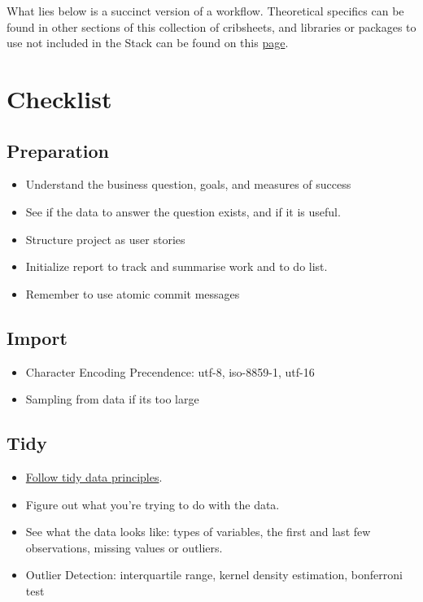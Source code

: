 \documentclass[]{book}
\theoremstyle{definition}
\theoremstyle{definition}
\theoremstyle{definition}
\theoremstyle{remark}
\begin{document}
What lies below is a succinct version of a workflow. Theoretical
specifics can be found in other sections of this collection of
cribsheets, and libraries or packages to use not included in the Stack
can be found on this
\href{https://gfleetwood.github.io/noted-resources/data_science.html}{page}.

\section{Checklist}\label{checklist}

\subsection{Preparation}\label{preparation}

\begin{itemize}
\item
  Understand the business question, goals, and measures of success
\item
  See if the data to answer the question exists, and if it is useful.
\item
  Structure project as user stories
\item
  Initialize report to track and summarise work and to do list.
\item
  Remember to use atomic commit messages
\end{itemize}

\subsection{Import}\label{import}

\begin{itemize}
\item
  Character Encoding Precendence: utf-8, iso-8859-1, utf-16
\item
  Sampling from data if its too large
\end{itemize}

\subsection{Tidy}\label{tidy}

\begin{itemize}
\item
  \href{http://vita.had.co.nz/papers/tidy-data.pdf}{Follow tidy data
  principles}.
\item
  Figure out what you're trying to do with the data.
\item
  See what the data looks like: types of variables, the first and last
  few observations, missing values or outliers.
\item
  Outlier Detection: interquartile range, kernel density estimation,
  bonferroni test
\end{itemize}
\end{document}
